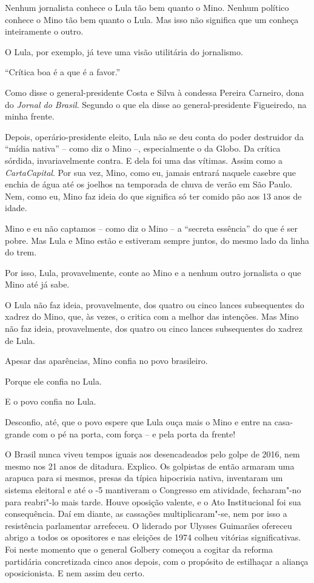 


Nenhum jornalista conhece o Lula tão bem quanto o Mino. Nenhum político conhece
o Mino tão bem quanto o Lula. Mas isso não significa que um conheça
inteiramente o outro.

O Lula, por exemplo, já teve uma visão utilitária do jornalismo.

“Crítica boa é a que é a favor.”

Como disse o general-presidente Costa e Silva à condessa Pereira Carneiro, dona
do \emph{Jornal do Brasil}.  Segundo o que ela disse ao general-presidente Figueiredo,
na minha frente.

Depois, operário-presidente eleito, Lula não se deu conta do poder destruidor
da “mídia nativa” – como diz o Mino –, especialmente o da Globo.  Da crítica
sórdida, invariavelmente contra. E dela foi uma das vítimas. Assim como a
\emph{CartaCapital}. Por sua vez, Mino, como eu, jamais entrará naquele casebre que
enchia de água até os joelhos na temporada de chuva de verão em São Paulo. Nem,
como eu, Mino faz ideia do que significa só ter comido pão aos 13 anos de
idade.

Mino e eu não captamos – como diz o Mino – a “secreta essência” do que é ser
pobre. Mas Lula e Mino estão e estiveram sempre juntos, do mesmo lado da linha
do trem.

Por isso, Lula, provavelmente, conte ao Mino e a nenhum outro jornalista o que
Mino até já sabe.

O Lula não faz ideia, provavelmente, dos quatro ou cinco lances subsequentes do
xadrez do Mino, que, às vezes, o critica com a melhor das intenções. Mas Mino
não faz ideia, provavelmente, dos quatro ou cinco lances subsequentes do xadrez
de Lula.

Apesar das aparências, Mino confia no povo brasileiro.

Porque ele confia no Lula.

E o povo confia no Lula.

Desconfio, até, que o povo espere que Lula ouça mais o Mino e entre na
casa-grande com o pé na porta, com força – e pela porta da frente!






O Brasil nunca viveu tempos iguais aos desencadeados pelo golpe de 2016,
nem mesmo nos 21 anos de ditadura. Explico. Os golpistas de então
armaram uma arapuca para si mesmos, presas da típica hipocrisia nativa,
inventaram um sistema eleitoral e até o -5 mantiveram o Congresso em
atividade, fecharam"-no para reabri"-lo mais tarde. Houve oposição
valente, e o Ato Institucional foi sua consequência. Daí em diante, as
cassações multiplicaram"-se, nem por isso a resistência parlamentar
arrefeceu. O  liderado por Ulysses Guimarães ofereceu abrigo a todos
os opositores e nas eleições de 1974 colheu vitórias significativas. Foi
neste momento que o general Golbery começou a cogitar da reforma
partidária concretizada cinco anos depois, com o propósito de estilhaçar
a aliança oposicionista. E nem assim deu certo.

